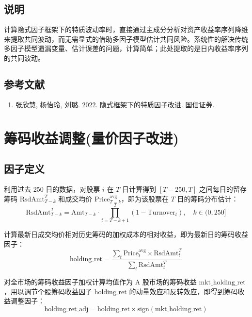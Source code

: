 \documentclass{article}
\begin{document}
\subsection{说明}
计算隐式因子框架下的特质波动率时，直接通过主成分分析对资产收益率序列降维来提取共同波动，而无需显式的借助多因子模型估计共同风险。系统性的解决传统多因子模型遗漏变量、估计误差的问题，计算简单；此处提取的是日内收益率序列的共同波动。

\subsection{参考文献}
\begin{enumerate}
    \item 张欣慧, 杨怡玲, 刘璐. 2022. 隐式框架下的特质因子改进. 国信证券.
\end{enumerate}

\section{筹码收益调整(量价因子改进)}

\subsection{因子定义}

利用过去 250 日的数据，对股票 \( i \) 在 \( T \) 日计算得到 \([T-250, T]\) 之间每日的留存筹码 \( \mathrm{RsdAmt}_{T-k}^T \) 和成交均价 \( \mathrm{Price}_{T-k}^{\mathrm{avg}} \)，即为该股票在 \( T \) 日的筹码分布估计：
\begin{equation}
    \mathrm{RsdAmt}_{T-k}^T = \mathrm{Amt}_{T-k} \cdot \prod_{t=T-k+1}^{T} (1 - \mathrm{Turnover}_t), \quad k \in (0, 250]
\end{equation}

计算最新日成交均价相对历史筹码的加权成本的相对收益，即为最新日的筹码收益因子：
\begin{equation}
    \mathrm{holding\_ret} = \frac{\sum_t \mathrm{Price}_t^{\mathrm{avg}} \times \mathrm{RsdAmt}_t^T}{\sum_t \mathrm{RsdAmt}_t^T} 
\end{equation}

对全市场的筹码收益因子加权计算均值作为 A 股市场的筹码收益 \( \mathrm{mkt\_holding\_ret} \)，用以调节个股筹码收益因子 \( \mathrm{holding\_ret} \) 的动量效应和反转效应，即得到筹码收益调整因子：
\begin{equation}
    \mathrm{holding\_ret\_adj} = \mathrm{holding\_ret} \times \mathrm{sign}(\mathrm{mkt\_holding\_ret})
\end{equation}
\end{document}
